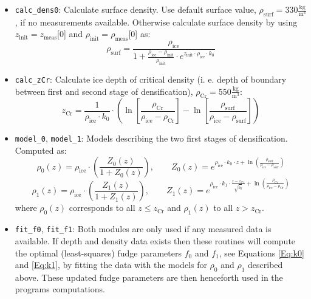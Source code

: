 \documentclass[../../CompleteThesis/Complete_1stDraft.tex]{subfiles}
\begin{document}
\begin{itemize}
	\item \lstinline[columns=fixed]|calc_dens0|:  Calculate surface density. Use default surface value, $\rho_{\text{surf}} = 330 \frac{\text{kg}}{\text{m}^3}$, if no measurements available. Otherwise calculate surface density by using $z_{\text{init}} = z_{\text{meas}}$[0] and $\rho_{\text{init}} = \rho_{\text{meas}}$[0] as:
	\begin{equation}
		\rho_{\text{surf}} = \frac{\rho_{\text{ice}}}{1 + \frac{\rho_{\text{ice}} - \rho_{\text{init}}}{\rho_{\text{init}}}\cdot e^{z_{\text{init}}\cdot \rho_{\text{ice}}\cdot k_0}}
		\label{Eq:rhoSurf}
	\end{equation}
	
	\item \lstinline[columns=fixed]|calc_zCr|: Calculate ice depth of critical density (i. e. depth of boundary between first and second stage of densification), $\rho_{\text{Cr}}=550\frac{\text{kg}}{\text{m}^3}$:
	\begin{equation}
		z_{\text{Cr}} = \frac{1}{\rho_{\text{ice}}\cdot k_0}\cdot\left(\ln \left[\frac{\rho_{\text{Cr}}}{\rho_{\text{ice}} - \rho_{\text{Cr}}}\right]-\ln\left[\frac{\rho_{\text{surf}}}{\rho_{\text{ice}} - \rho_{\text{surf}}}\right]\right)
		\label{Eq:zCr}
	\end{equation}
	
	\item \lstinline[columns=fixed]|model_0|, \lstinline[columns=fixed]|model_1|: Models describing the two first stages of densification. Computed as:
	\begin{equation}
		\rho_0(z) = \rho_{\text{ice}}\cdot \left(\frac{Z_0(z)}{1+Z_0(z)}\right), \qquad Z_0(z) = e^{\rho_{\text{ice}}\cdot k_0 \cdot z + \ln(\frac{\rho_{\text{surf}}}{\rho_{\text{ice}} - \rho_{\text{surf}}})}
		\label{Eq:rhoModel0}
	\end{equation}
	\begin{equation}
		\rho_1(z) = \rho_{\text{ice}}\cdot \left(\frac{Z_1(z)}{1+Z_1(z)}\right), \qquad Z_1(z) = e^{\rho_{\text{ice}}\cdot k_1 \cdot \frac{z - z_{Cr}}{\sqrt{\dot{b}_0}} + \ln(\frac{\rho_{\text{Cr}}}{\rho_{\text{ice}} - \rho_{\text{Cr}}})}
		\label{Eq:rhoModel1}
	\end{equation}
	where $\rho_0(z)$ corresponds to all $z \leq z_{\text{Cr}}$ and $\rho_1(z)$ to all $z > z_{\text{Cr}}$.
	\item \lstinline[columns=fixed]|fit_f0|,  \lstinline[columns=fixed]|fit_f1|: Both modules are only used if any measured data is available. If depth and density data exists then these routines will compute the optimal (least-squares) fudge parameters $f_0$ and $f_1$, see Equations \ref{Eq:k0} and \ref{Eq:k1}, by fitting the data with the models for $\rho_0$ and $\rho_1$ described above. These updated fudge parameters are then henceforth used in the programs computations.
	

\end{itemize}
\end{document}
